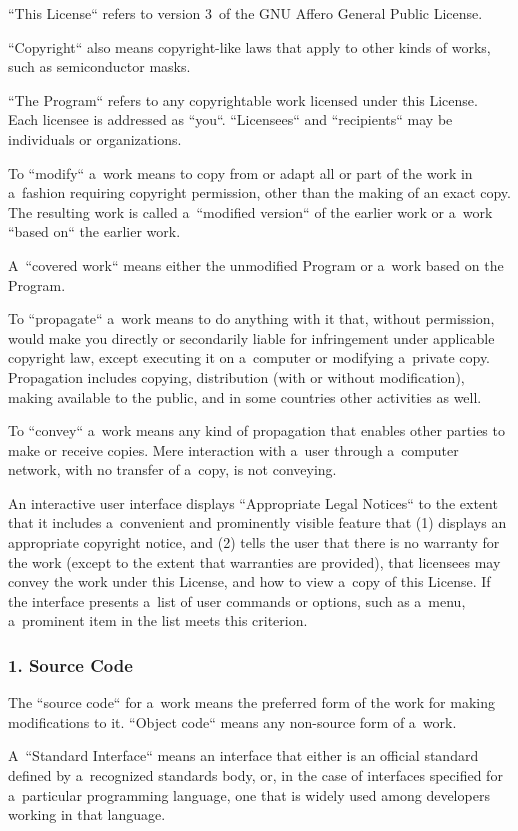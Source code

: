 \documentclass[a4paper, 11pt, twoside]{article}
\begin{document}
“This License“ refers to version 3~of the GNU Affero General Public License.

“Copyright“ also means copyright-like laws that apply to other kinds of works, such as semiconductor masks.

“The Program“ refers to any copyrightable work licensed under this License. Each licensee is addressed as “you“. “Licensees“ and “recipients“ may be individuals or organizations.

To “modify“ a~work means to copy from or adapt all or part of the work in a~fashion requiring copyright permission, other than the making of an exact copy. The resulting work is called a~“modified version“ of the earlier work or a~work “based on“ the earlier work.

A~“covered work“ means either the unmodified Program or a~work based on the Program.

To “propagate“ a~work means to do anything with it that, without permission, would make you directly or secondarily liable for infringement under applicable copyright law, except executing it on a~computer or modifying a~private copy. Propagation includes copying, distribution (with or without modification), making available to the public, and in some countries other activities as well.

To “convey“ a~work means any kind of propagation that enables other parties to make or receive copies. Mere interaction with a~user through a~computer network, with no transfer of a~copy, is not conveying.

An interactive user interface displays “Appropriate Legal Notices“ to the extent that it includes a~convenient and prominently visible feature that (1) displays an appropriate copyright notice, and (2) tells the user that there is no warranty for the work (except to the extent that warranties are provided), that licensees may convey the work under this License, and how to view a~copy of this License. If the interface presents a~list of user commands or options, such as a~menu, a~prominent item in the list meets this criterion.

\subsubsection{1. Source Code}

The “source code“ for a~work means the preferred form of the work for making modifications to it. “Object code“ means any non-source form of a~work.

A~“Standard Interface“ means an interface that either is an official standard defined by a~recognized standards body, or, in the case of interfaces specified for a~particular programming language, one that is widely used among developers working in that language.
\end{document}
